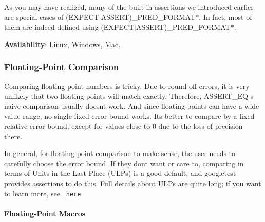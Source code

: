 As you may have realized, many of the built-\/in assertions we introduced earlier are special cases of {\ttfamily (E\+X\+P\+E\+C\+T$\vert$\+A\+S\+S\+E\+RT)\+\_\+\+P\+R\+E\+D\+\_\+\+F\+O\+R\+M\+A\+T$\ast$}. In fact, most of them are indeed defined using {\ttfamily (E\+X\+P\+E\+C\+T$\vert$\+A\+S\+S\+E\+RT)\+\_\+\+P\+R\+E\+D\+\_\+\+F\+O\+R\+M\+A\+T$\ast$}.

{\bfseries{Availability}}\+: Linux, Windows, Mac.

\subsubsection*{Floating-\/\+Point Comparison}

Comparing floating-\/point numbers is tricky. Due to round-\/off errors, it is very unlikely that two floating-\/points will match exactly. Therefore, {\ttfamily A\+S\+S\+E\+R\+T\+\_\+\+EQ} \textquotesingle{}s naive comparison usually doesn\textquotesingle{}t work. And since floating-\/points can have a wide value range, no single fixed error bound works. It\textquotesingle{}s better to compare by a fixed relative error bound, except for values close to 0 due to the loss of precision there.

In general, for floating-\/point comparison to make sense, the user needs to carefully choose the error bound. If they don\textquotesingle{}t want or care to, comparing in terms of Units in the Last Place (U\+L\+Ps) is a good default, and googletest provides assertions to do this. Full details about U\+L\+Ps are quite long; if you want to learn more, see \href{https://randomascii.wordpress.com/2012/02/25/comparing-floating-point-numbers-2012-edition/}{\texttt{ here}}.

\paragraph*{Floating-\/\+Point Macros}

